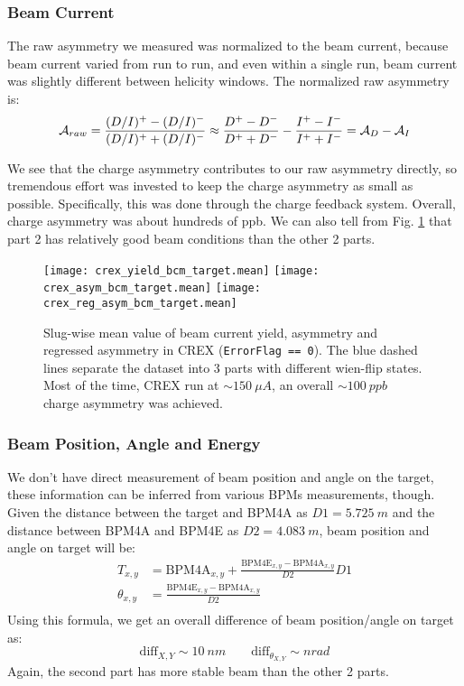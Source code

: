 \subsubsection{Beam Current}
The raw asymmetry we measured was normalized to the beam current, because beam
current varied from run to run, and even within a single run, beam current was 
slightly different between helicity windows. The normalized raw asymmetry is:
\begin{equation}
    \mathcal{A}_{raw} = \frac{(D/I)^+ - (D/I)^-}{(D/I)^+ + (D/I)^-}
	\approx \frac{D^+ - D^-}{D^+ + D^-} - \frac{I^+ - I^-}{I^+ + I^-}
	= \mathcal{A}_D - \mathcal{A}_I
\end{equation}

We see that the charge asymmetry contributes to our raw asymmetry directly, so
tremendous effort was invested to keep the charge asymmetry as small as possible.
Specifically, this was done through the charge feedback system. Overall, charge
asymmetry was about hundreds of ppb. We can also tell from Fig. \ref{fig:crex_bcm_target}
that part 2 has relatively good beam conditions than the other 2 parts.
\begin{figure}[H]
    \centering
    \texttt{[image: crex\_yield\_bcm\_target.mean]}
    \texttt{[image: crex\_asym\_bcm\_target.mean]}
    \texttt{[image: crex\_reg\_asym\_bcm\_target.mean]}
    \caption{Slug-wise mean value of beam current yield, asymmetry and regressed 
    asymmetry in CREX (\texttt{ErrorFlag == 0}). The blue dashed lines separate
    the dataset into 3 parts with different wien-flip states.
    Most of the time, CREX run at $\sim 150\ \mu A$, an overall $\sim 100\ ppb$ charge 
    asymmetry was achieved.}
    \label{fig:crex_bcm_target}
\end{figure}

\subsubsection{Beam Position, Angle and Energy}
We don't have direct measurement of beam position and angle on the target, these 
information can be inferred from various BPMs measurements, though. Given the 
distance between the target and BPM4A as $D1 = 5.725\ m$ and the distance
between BPM4A and BPM4E as $D2 =4.083\ m$, beam position and angle on target 
will be:
\begin{equation}
    \begin{aligned}
	T_{x,y} &= \text{BPM4A}_{x,y} + \frac{\text{BPM4E}_{x,y} - \text{BPM4A}_{x,y}}{D2} D1	\\
	\theta_{x,y} &= \frac{\text{BPM4E}_{x,y} - \text{BPM4A}_{x,y}}{D2} \\
    \end{aligned}
\end{equation}
Using this formula, we get an overall difference of beam position/angle on target as:
\begin{equation*}
    \text{diff}_{X,Y} \sim 10\ nm	\qquad \text{diff}_{\theta_{X,Y}} \sim nrad	
\end{equation*}
Again, the second part has more stable beam than the other 2 parts.

